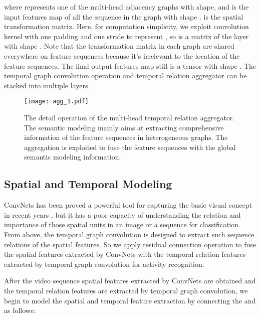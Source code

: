 \documentclass[conference,compsoc]{IEEEtran}
\begin{document}
    where  represents one of the multi-head adjacency graphs with  shape, and  is the input features map of all the sequence in the graph with shape .  is the spatial transformation matrix. Here, for computation simplicity, we exploit convolution kernel  with one padding and one stride to represent , so  is a matrix of the layer with shape . Note that the transformation matrix  in each graph are shared everywhere on feature sequences because it's irrelevant to the location of the feature sequences. The final output features map  still is a tensor with shape . The temporal graph convolution operation and temporal relation aggregator can be stacked into multiple layers.
    
    \vspace{-1.1em}
    \begin{figure}[h]
    \centering
    \texttt{[image: agg\_1.pdf]}
    \vspace{-0.1in}
    \caption{The detail operation of the multi-head temporal relation aggregator. The semantic modeling mainly aims at extracting comprehensive information of the feature sequences in heterogeneous graphs. The aggregation is exploited to fuse the feature sequences with the global semantic modeling information.}
    \label{fig:module2}
    \vspace{-1em}
    \end{figure}
    
    
\subsection{Spatial and Temporal Modeling}
    ConvNets has been proved a powerful tool for capturing the basic visual concept in recent years \cite{simonyan2014very, he2016deep, ren2017faster}, but it has a poor capacity of understanding the relation and importance of those spatial units in an image or a sequence for classification. From above, the temporal graph convolution is designed to extract such sequence relations of the spatial features. So we apply residual connection operation \cite{he2016deep} to fuse the spatial features extracted by ConvNets with the temporal relation features extracted by temporal graph convolution for activity recognition.
    
    After the video sequence spatial features  extracted by ConvNets are obtained and the temporal relation features  are extracted by temporal graph convolution, we begin to model the spatial and temporal feature extraction by connecting the  and  as follows:
    
\end{document}

